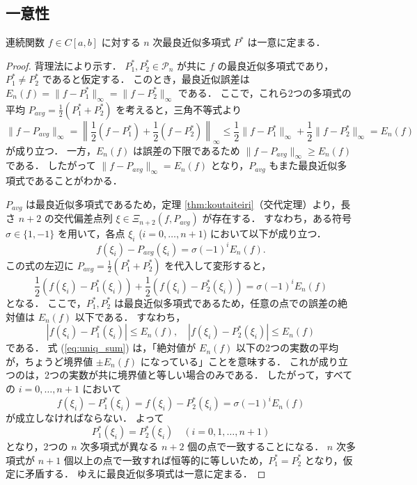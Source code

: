   \subsection{一意性}
    \begin{theorem}[最良近似多項式の一意性]
    \label{thm:uniqueness}
      連続関数 $f \in C[a, b]$ に対する $n$ 次最良近似多項式 $P^*$ は一意に定まる．
    \end{theorem}

    \begin{proof}
      背理法により示す． $P^*_1, P^*_2 \in \mathcal{P}_n$ が共に $f$ の最良近似多項式であり，$P^*_1 \neq P^*_2$ であると仮定する．
      このとき，最良近似誤差は $E_n(f) = \|f - P^*_1\|_\infty = \|f - P^*_2\|_\infty$ である．
      ここで，これら2つの多項式の平均 $P_{avg} = \frac{1}{2}(P^*_1 + P^*_2)$ を考えると，三角不等式より
      \begin{equation}
        \|f - P_{avg}\|_\infty = \left\| \frac{1}{2}(f - P^*_1) + \frac{1}{2}(f - P^*_2) \right\|_\infty
        \le \frac{1}{2}\|f - P^*_1\|_\infty + \frac{1}{2}\|f - P^*_2\|_\infty = E_n(f)
      \end{equation}
      が成り立つ． 一方，$E_n(f)$ は誤差の下限であるため $\|f - P_{avg}\|_\infty \ge E_n(f)$ である．
      したがって $\|f - P_{avg}\|_\infty = E_n(f)$ となり，$P_{avg}$ もまた最良近似多項式であることがわかる．

      $P_{avg}$ は最良近似多項式であるため，定理 \ref{thm:koutaiteiri}（交代定理）より，長さ $n+2$ の交代偏差点列 $\xi \in \Xi_{n+2}(f, P_{avg})$ が存在する．
      すなわち，ある符号 $\sigma \in \{1, -1\}$ を用いて，各点 $\xi_i$ ($i=0, \dots, n+1$) において以下が成り立つ．
      \begin{equation}
        f(\xi_i) - P_{avg}(\xi_i) = \sigma (-1)^i E_n(f).
      \end{equation}
      この式の左辺に $P_{avg} = \frac{1}{2}(P^*_1 + P^*_2)$ を代入して変形すると，
      \begin{equation}
        \frac{1}{2}(f(\xi_i) - P^*_1(\xi_i)) + \frac{1}{2}(f(\xi_i) - P^*_2(\xi_i)) = \sigma (-1)^i E_n(f)
        \label{eq:uniq_sum}
      \end{equation}
      となる． ここで，$P^*_1, P^*_2$ は最良近似多項式であるため，任意の点での誤差の絶対値は $E_n(f)$ 以下である．
      すなわち，
      \[ |f(\xi_i) - P^*_1(\xi_i)| \le E_n(f), \quad |f(\xi_i) - P^*_2(\xi_i)| \le E_n(f) \]
      である．
      式 (\ref{eq:uniq_sum}) は，「絶対値が $E_n(f)$ 以下の2つの実数の平均が，ちょうど境界値 $\pm E_n(f)$ になっている」ことを意味する．
      これが成り立つのは，2つの実数が共に境界値と等しい場合のみである．
      したがって，すべての $i=0, \dots, n+1$ において
      \begin{equation}
        f(\xi_i) - P^*_1(\xi_i) = f(\xi_i) - P^*_2(\xi_i) = \sigma (-1)^i E_n(f)
      \end{equation}
      が成立しなければならない． よって
      \[ P^*_1(\xi_i) = P^*_2(\xi_i) \quad (i = 0, 1, \dots, n+1) \]
      となり，2つの $n$ 次多項式が異なる $n+2$ 個の点で一致することになる．
      $n$ 次多項式が $n+1$ 個以上の点で一致すれば恒等的に等しいため，$P^*_1 = P^*_2$ となり，仮定に矛盾する．
      ゆえに最良近似多項式は一意に定まる．
    \end{proof}


\newpage  %